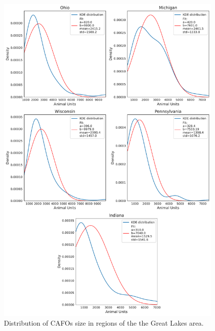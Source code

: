 \documentclass[authoryear]{elsarticle}
\begin{document}
\begin{figure}[H]
	\centering
	\includegraphics[width=0.81\linewidth, trim={0cm 0cm 0cm 0cm},clip]{SupMat_Figures/CAFOs_Size_Distribution} 
	\caption{Distribution of CAFOs size in regions of the the Great Lakes area.}
	\label{fig:CAFOsSizeDist}
\end{figure}
	
%
%

	
\end{document}
